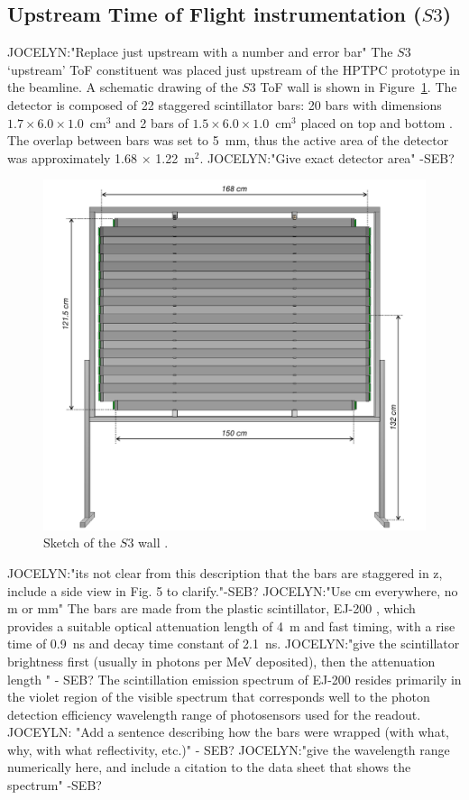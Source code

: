     
\subsection{Upstream Time of Flight instrumentation ($S3$)}
JOCELYN:"Replace just upstream with a number and error bar"
The $S3$ `upstream' ToF constituent was placed just upstream of the HPTPC prototype in the beamline. A schematic drawing of the $S3$ ToF wall is shown in Figure~\ref{fig:S3sketch}. The detector is composed of 22 staggered scintillator bars:  20 bars with dimensions $1.7 \times 6.0 \times 1.0$~cm$^3$ and 2 bars of  $1.5 \times 6.0 \times 1.0$~cm$^3$ placed on top and bottom \cite{S3-proceedings}.
The overlap between bars was set to 5~mm, thus the active area of the detector was approximately 1.68 $\times$ 1.22~m$^2$.
JOCELYN:"Give exact detector area" -SEB?
     \begin{figure}
      \centering
    \includegraphics[width=0.7\linewidth]{files/Figures/uToF_sketch.pdf}
    	\caption{Sketch of the $S3$ wall \cite{S3-proceedings}.}
    		\label{fig:S3sketch}
    \end{figure}
JOCELYN:"its not clear from this description that the bars are staggered in z, include a side view in Fig. 5 to clarify."-SEB?
JOCELYN:"Use cm everywhere, no m or mm"
The bars are made from the plastic scintillator, EJ-200 \cite{SCIONIX}, which 
provides a suitable optical attenuation length of 4~m and fast timing, with a rise time of 0.9~ns and decay time constant of 2.1~ns.
JOCELYN:"give the scintillator brightness first (usually in photons per MeV deposited), then the attenuation length " - SEB?
The scintillation emission spectrum of EJ-200 resides primarily in the violet region of the visible spectrum that corresponds well to the photon detection efficiency wavelength range of photosensors used for the readout. JOCEYLN: "Add a sentence describing how the bars were wrapped (with what, why, with what reflectivity, etc.)" - SEB?
JOCELYN:"give the wavelength range numerically here, and include a citation to the data sheet that shows the spectrum" -SEB?

